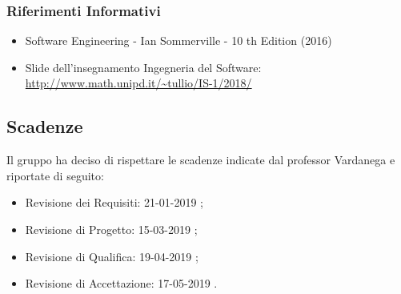 		\subsubsection{Riferimenti Informativi}
			\begin{itemize}
				\item Software Engineering - Ian Sommerville - 10 th Edition (2016)
				\item Slide dell’insegnamento Ingegneria del Software:\\
				\url{http://www.math.unipd.it/~tullio/IS-1/2018/}
			\end{itemize}
		
	\subsection{Scadenze}
	Il gruppo ha deciso di rispettare le scadenze indicate dal professor Vardanega e riportate di seguito:
	\begin{itemize}
		\item Revisione dei Requisiti: 21-01-2019 ;
		\item Revisione di Progetto: 15-03-2019 ;
		\item Revisione di Qualifica: 19-04-2019 ;
		\item Revisione di Accettazione: 17-05-2019 .
	\end{itemize}
	
